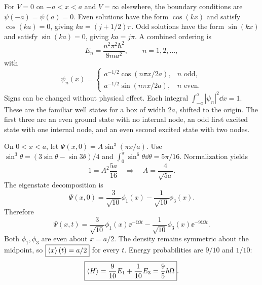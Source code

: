 For $V=0$ on $-a<x<a$ and $V=\infty$ elsewhere,
the boundary conditions are $\psi(-a)=\psi(a)=0$.
Even solutions have the form $\cos(kx)$ and satisfy
$\cos(ka)=0$, giving $ka=(j+1/2)\pi$.
Odd solutions have the form $\sin(kx)$ and satisfy
$\sin(ka)=0$, giving $ka=j\pi$.
A combined ordering is
\begin{equation}
\boxed{E_n=\frac{n^2\pi^2\hbar^2}{8ma^2}},\qquad
n=1,2,\ldots,
\end{equation}
with
\begin{equation}
\boxed{\psi_n(x)=
\begin{cases}
a^{-1/2}\cos(n\pi x/2a),&n\text{ odd},\\
a^{-1/2}\sin(n\pi x/2a),&n\text{ even}.
\end{cases}}
\end{equation}
Signs can be changed without physical effect.
Each integral $\int_{-a}^a|\psi_n|^2\dd x=1$.
These are the familiar well states for a box of
width $2a$, shifted to the origin. The first three
are an even ground state with no internal node,
an odd first excited state with one internal node,
and an even second excited state with two nodes.

On $0<x<a$, let $\Psi(x,0)=A\sin^3(\pi x/a)$.
Use $\sin^3\theta=(3\sin\theta-\sin3\theta)/4$ and
$\int_0^\pi\sin^6\theta\dd\theta=5\pi/16$.
Normalization yields
\begin{equation}
1=A^2\frac{5a}{16}
\quad\Rightarrow\quad \boxed{A=\frac4{\sqrt{5a}}}.
\end{equation}
The eigenstate decomposition is
\begin{equation}
\Psi(x,0)=\frac3{\sqrt{10}}\phi_1(x)
-\frac1{\sqrt{10}}\phi_3(x).
\end{equation}
Therefore
\begin{equation}
\boxed{\Psi(x,t)=\frac3{\sqrt{10}}\phi_1(x)\ee^{-\ii\Omega t}
-\frac1{\sqrt{10}}\phi_3(x)\ee^{-9\ii\Omega t}}.
\end{equation}
Both $\phi_1,\phi_3$ are even about $x=a/2$.
The density remains symmetric about the midpoint,
so $\boxed{\left\langle x\right\rangle(t)=a/2}$ for every $t$.
Energy probabilities are $9/10$ and $1/10$:
\begin{equation}
\boxed{\left\langle H\right\rangle=\frac9{10}E_1+\frac1{10}E_3
=\frac95\hbar\Omega}.
\end{equation}

